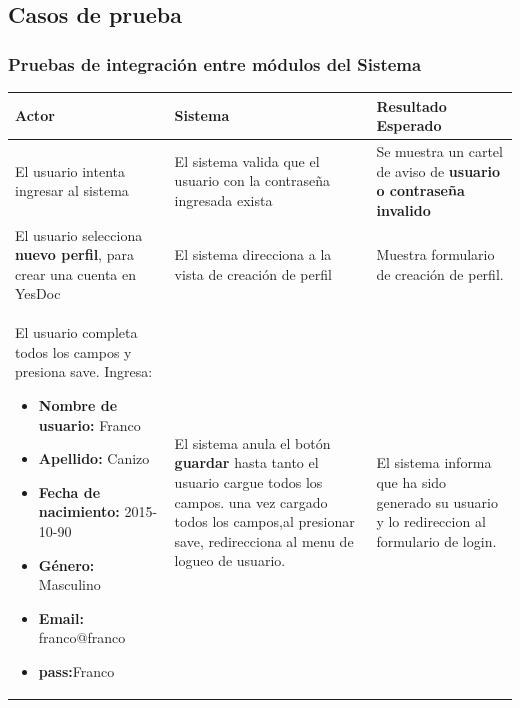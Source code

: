 \documentclass[a4paper,12pt]{article}
\begin{document}
\subsection{Casos de prueba}

\subsubsection{Pruebas  de  integración  entre módulos del Sistema}












\begin{longtable}{|p{5cm}|p{5cm}|p{5cm}|}
\hline
Actor  & Sistema& Resultado Esperado \\ \hline

El usuario intenta ingresar al sistema & El sistema valida que el usuario con la contraseña ingresada exista & Se muestra un cartel de aviso de \textbf{usuario o contraseña invalido} \\ \hline

El usuario selecciona \textbf{nuevo perfil}, para
crear una cuenta en YesDoc 
& El sistema direcciona a la vista de creación de perfil
& Muestra formulario de creación de perfil.\\ \hline

 El usuario completa todos los campos y presiona save.
 Ingresa:
\begin{itemize}
	\item \textbf{Nombre de usuario:} Franco
	\item \textbf{Apellido:} Canizo
	\item \textbf{Fecha de nacimiento: }2015-10-90
	\item \textbf{Género: }Masculino
	\item \textbf{Email: }franco@franco
	\item \textbf{pass:}Franco

\end{itemize}
& El sistema anula el botón \textbf{guardar }hasta tanto el usuario cargue todos los campos. una vez cargado todos los campos,al presionar save, redirecciona al menu
de logueo de usuario.
& El sistema informa que ha sido generado su usuario y lo redireccion al formulario de login.
\\ \hline




\end{longtable}
\end{document}

